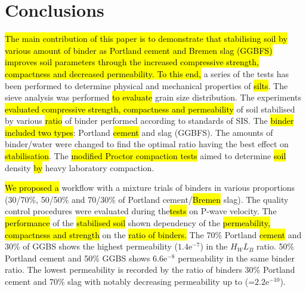 \documentclass{amestyle}
\begin{document}
\section{Conclusions}
\label{sec:conclusions}

\hl{The main contribution of this paper is to demonstrate that stabilising soil by various amount of binder as Portland cement and Bremen slag (GGBFS) improves soil parameters through the increased compressive strength, compactness and decreased permeability. To this end,} a series of the \hl{ }tests\hl{ }has been performed\hl{ }to determine physical and mechanical properties of \hl{silts}. The sieve analysis was performed \hl{to evaluate} grain size distribution. The experiments \hl{evaluated compressive strength, compactness and permeability} of soil stabilised by various \hl{ratio} of binder\hl{ }performed according to \hl{ }standards of SIS. The \hl{binder included two types}: Portland \hl{cement} and slag (GGBFS). The amounts of binder/water were changed to find the optimal ratio having the best effect on \hl{stabilisation}. The \hl{modified Proctor compaction tests} aimed to determine \hl{soil }density \hl{by} heavy laboratory compaction. 

\hl{We proposed a} workflow with a mixture trials of binders in various proportions (30/70\%, 50/50\% and 70/30\% of Portland cement/\hl{Bremen} slag). The quality control procedures were evaluated during the\hl{tests} on P-wave velocity\hl{}. The \hl{performance} of the \hl{stabilised soil} shown dependency of the \hl{permeability, compactness and strength} on the \hl{ratio of binders.} The 70\% Portland \hl{cement} and 30\% of GGBS shows the highest permeability ($1.4\mathrm{e}^{-7}$) in the $H_WL_B$ ratio. 50\% Portland cement and 50\% GGBS shows $6.6\mathrm{e}^{-8}$ permeability in the same binder ratio. The lowest permeability is recorded by the ratio of binders 30\% Portland cement and 70\% slag with notably decreasing permeability up to (=$2.2\mathrm{e}^{-10}$).
\end{document}
